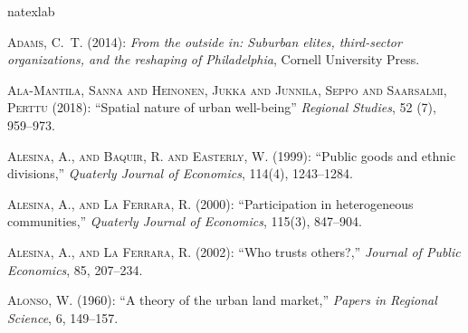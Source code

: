 \documentclass[11pt, letterpaper]{article}
\begin{document}
\begin{spacing}{1.4}

%



\begin{thebibliography}{92}
\newcommand{\enquote}[1]{``#1''}
\expandafter\ifx\csname natexlab\endcsname\relax\def\natexlab#1{#1}\fi

\textsc{Adams, C.~T.} (2014): \emph{From the outside in: Suburban elites,
  third-sector organizations, and the reshaping of Philadelphia}, Cornell
  University Press.

\textsc{Ala-Mantila, Sanna and Heinonen, Jukka and Junnila, Seppo and Saarsalmi, Perttu} (2018): \enquote{Spatial nature of urban well-being} \emph{Regional Studies}, 52 (7), 959--973. 

\textsc{Alesina, A., and Baquir, R. and Easterly, W.} (1999): \enquote{Public goods and ethnic divisions,}
  \emph{Quaterly Journal of Economics}, 114(4), 1243--1284.
  
\textsc{Alesina, A., and La Ferrara, R.} (2000): \enquote{Participation in heterogeneous communities,}
  \emph{Quaterly Journal of Economics}, 115(3), 847--904.

\textsc{Alesina, A., and La Ferrara, R.} (2002): \enquote{Who trusts others?,}
  \emph{Journal of Public Economics}, 85, 207--234.
  
\textsc{Alonso, W.} (1960): \enquote{A theory of the urban land market,}
  \emph{Papers in Regional Science}, 6, 149--157.


\end{thebibliography}
\end{spacing}
\end{document}
